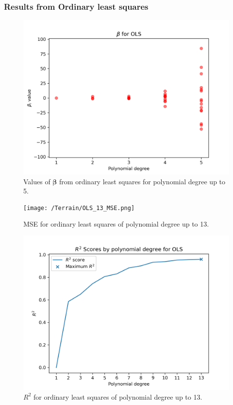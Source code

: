 \documentclass{article}
\begin{document}
\subsubsection{Results from Ordinary least squares}
\begin{figure}[htbp]
    \centering
    \includegraphics[width=\textwidth*2/3]{Terrain/OLS_5_betas.png}
    \caption{Values of $\boldsymbol{\beta}$ from ordinary least squares for polynomial degree up to 5.}
    \label{fig:TerrainOLS5Beta}
\end{figure}

\begin{figure}[htbp]
    \centering
    \texttt{[image: /Terrain/OLS\_13\_MSE.png]}
    \caption{MSE for ordinary least squares of polynomial degree up to 13.}
    \label{fig:TerrainOLS5MSE}
\end{figure}

\begin{figure}[htbp]
    \centering
    \includegraphics[width=\textwidth*2/3]{Project1/figures/Terrain/OLS_13_R2.png}
    \caption{$R^2$ for ordinary least squares of polynomial degree up to 13.}
    \label{fig:TerrainOLS5R2}
\end{figure}
\end{document}
